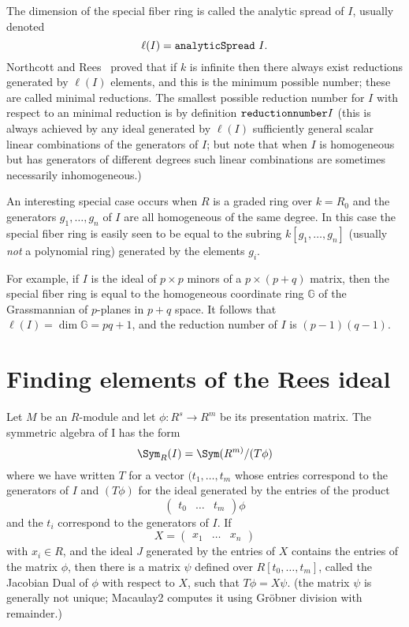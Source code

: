 \documentclass[twoside,12pt, leqno]{amsart}
\begin{document}
The dimension of the special fiber ring is called the analytic spread of $I$, usually
denoted
$$
\ell(I) = {\tt analyticSpread\ }I.
$$
Northcott and Rees~\cite{NR} proved that if $k$ is infinite then there always exist reductions
generated by $\ell(I)$ elements, and this is the minimum possible number; these are called
minimal reductions. The smallest possible reduction number for $I$ with respect to an minimal reduction is  by definition ${\tt reduction number} I$ (this is always achieved by any ideal generated by $\ell(I)$ sufficiently general scalar linear combinations of the generators of $I$; but note that when $I$ is homogeneous but has generators of different degrees such linear combinations are sometimes necessarily inhomogeneous.)

An interesting special case occurs when $R$ is a graded ring over $k = R_0$ and the generators $g_1,\dots, g_n$ of $I$ are all homogeneous of the same degree. In this case the special fiber ring is easily seen to be equal to the subring $k[g_1,\dots,g_n]$ (usually \emph{not} a polynomial ring) generated by the elements $g_i$.

\def\G{{\mathbb G}}
For example, if $I$ is the ideal of $p\times p$ minors of a $p\times (p+q)$ matrix, then
the special fiber ring is equal to the homogeneous coordinate ring $\G$ of the Grassmannian of
$p$-planes in $p+q$ space. It follows that $\ell(I) = \dim \G = pq+1$, and the reduction number of $I$ is
$(p-1)(q-1)$.

\section{Finding elements of the Rees ideal}%

Let $M$ be an $R$-module and let $\phi: R^{s}\to R^{m}$ be its presentation matrix.
     The symmetric algebra of I has the form      
     $$
     \Sym_R(I) = \Sym(R^{m)}/(T\phi)
     $$
     where we have written $T$ for a vector
     $(t_{1}, \dots, t_{m}$ whose entries correspond to the generators of $I$ and
      $(T\phi)$  for the ideal generated by the entries
     of the product 
 $$
\begin{pmatrix}
 t_{0}&\dots&t_{m}
\end{pmatrix}\phi
$$
and the $t_{i}$ correspond to the generators of $I$. If 
     $$
     X = \begin{pmatrix}
x_1&\dots&x_{n}
\end{pmatrix}
$$
     with $x_i \in R$, and the ideal $J$ generated by the entries of $X$ 
     contains the entries of the matrix $\phi$, then there is 
     a matrix $\psi$ defined over $R[t_0, \dots, t_m]$, called the Jacobian Dual of $\phi$ with respect to $X$,
     such that $T\phi = X\psi$. (the matrix $\psi$ is generally
     not unique; Macaulay2 computes it using Gr\"obner division with remainder.)
           
\end{document}
